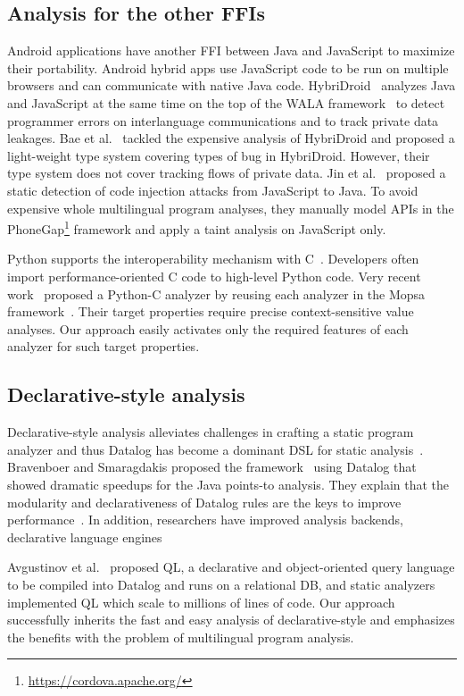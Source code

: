 
\subsection{Analysis for the other FFIs}
Android applications have another FFI between Java and JavaScript to maximize
their portability.  Android hybrid apps use JavaScript code to be run on
multiple browsers and can communicate with native Java code.
HybriDroid~\cite{HybriDroid} analyzes Java and JavaScript at the same time on
the top of the WALA framework~\cite{WALA} to detect programmer errors on interlanguage
communications and to track private data leakages.  Bae et al.~\cite{BaeICSE19}
tackled the expensive analysis of HybriDroid and proposed a light-weight type
system covering types of bug in HybriDroid.  However, their type system does not
cover tracking flows of private data.  Jin et al.~\cite{jin2014code} proposed a
static detection of code injection attacks from JavaScript to Java.  To avoid
expensive whole multilingual program analyses, they manually model APIs in the
PhoneGap\footnote{\url{https://cordova.apache.org/}} framework and apply a taint
analysis on JavaScript only.


Python supports the interoperability mechanism with C~\cite{PythonC}.
Developers often import performance-oriented C code to high-level Python code.
Very recent work~\cite{sas2021} proposed a Python-C analyzer by reusing each
analyzer in the Mopsa framework~\cite{Mopsa}.  Their target properties require
precise context-sensitive value analyses.  Our approach easily activates only
the required features of each analyzer for such target properties.


\subsection{Declarative-style analysis}
Declarative-style analysis alleviates challenges in crafting a static program
analyzer and thus Datalog  has become a dominant
DSL for static analysis~\cite{scholz2016}.
Bravenboer and Smaragdakis proposed the \doop framework~\cite{doop} using Datalog
that showed dramatic speedups for the Java points-to analysis.  They explain that
the modularity and declarativeness of Datalog rules are the keys to improve
performance~\cite{doopWorkshop}.  In addition, researchers have improved
analysis backends, declarative language engines%

Avgustinov et al.~\cite{ql2016} proposed QL, a declarative and object-oriented
query language to be compiled into Datalog and runs on a relational DB, and static
analyzers implemented QL which scale to millions of lines of code.
Our approach successfully inherits the fast and easy analysis of declarative-style
and emphasizes the benefits with the problem of multilingual program analysis.
